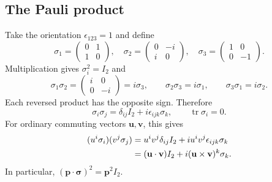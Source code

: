 \subsection{The Pauli product}
Take the orientation $\epsilon_{123}=1$ and define
\begin{equation}\label{qft:pauli-matrices}
 \sigma_1=\begin{pmatrix}0&1\\1&0\end{pmatrix},\quad
 \sigma_2=\begin{pmatrix}0&-i\\i&0\end{pmatrix},\quad
 \sigma_3=\begin{pmatrix}1&0\\0&-1\end{pmatrix}.
\end{equation}
Multiplication gives $\sigma_i^2=I_2$ and
\begin{equation}\label{qft:pauli-cyclic}
 \sigma_1\sigma_2=\begin{pmatrix}i&0\\0&-i\end{pmatrix}=i\sigma_3,
 \qquad \sigma_2\sigma_3=i\sigma_1,\qquad
 \sigma_3\sigma_1=i\sigma_2.
\end{equation}
Each reversed product has the opposite sign. Therefore
\begin{equation}\label{qft:pauli-product}
 \sigma_i\sigma_j=\delta_{ij}I_2+i\epsilon_{ijk}\sigma_k,
 \qquad \operatorname{tr}\sigma_i=0.
\end{equation}
For ordinary commuting vectors $\mathbf u,\mathbf v$, this gives
\begin{align}
 (u^i\sigma_i)(v^j\sigma_j)
 &=u^iv^j\delta_{ij}I_2+i u^iv^j\epsilon_{ijk}\sigma_k\notag\\
 &=(\mathbf u\cdot\mathbf v)I_2
   +i(\mathbf u\times\mathbf v)^k\sigma_k.
 \label{qft:pauli-vector-product}
\end{align}
In particular, $(\mathbf p\cdot\boldsymbol\sigma)^2=\mathbf p^2I_2$.

